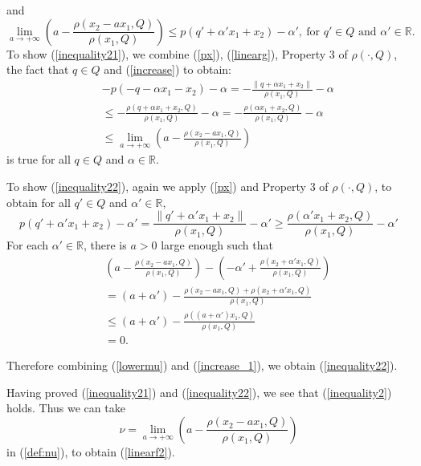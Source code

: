 \documentclass[12pt, reqno]{amsart}
\theoremstyle{definition}
\theoremstyle{remark}
\numberwithin{equation}{section}
\begin{document}
and
\begin{equation}
\label{inequality22}
\lim\limits_{a\to+\infty}\left(a-\frac{\rho(x_2-a x_1,Q)}{\rho(x_1,Q)}\right)\le p(q'+\alpha' x_1+x_2)-\alpha',~\mbox{for $q'\in Q$ and $\alpha'\in\mathbb R$}.
\end{equation}
 To show (\ref{inequality21}), we combine (\ref{px}), (\ref{linearg}),  Property 3 of  $\rho( \cdot , Q)$, the fact that $q\in Q$ and (\ref{increase}) to obtain:
      \begin{eqnarray}
     \label{uppermu}
     &&-p(-q-\alpha x_1-x_2)-\alpha=-\frac{\|q+\alpha x_1+x_2\|}{\rho(x_1,Q)}-\alpha\nonumber\\
     &&\le -\frac{\rho(q+\alpha x_1+x_2,Q)}{\rho(x_1,Q)}-\alpha=-\frac{\rho(\alpha x_1+x_2,Q)}{\rho(x_1,Q)}-\alpha\nonumber\\
     &&\le \lim_{a\to+\infty}\left(a-\frac{\rho(x_2-a x_1,Q)}{\rho(x_1,Q)}\right)
     \end{eqnarray}
     is true  for all $q\in Q$ and $\alpha\in \mathbb R$.

      To show (\ref{inequality22}),  again we apply (\ref{px}) and Property 3  of $\rho(\cdot , Q)$, to obtain for all $q'\in Q$ and $\alpha'\in \mathbb R$,
     \begin{equation}
     \label{lowermu}
     p(q'+\alpha' x_1+x_2)-\alpha'=\frac{\|q'+\alpha' x_1+x_2\|}{\rho(x_1,Q)}-\alpha'\ge\frac{\rho(\alpha' x_1+x_2,Q)}{\rho(x_1,Q)}-\alpha'
     \end{equation}
     For each $\alpha'\in\mathbb R$, there is  $a>0$ large enough such that
     \begin{eqnarray}
\label{increase_1}
&&\left(a-\frac{\rho(x_2-a x_1,Q)}{\rho(x_1,Q)}\right)-\left(-\alpha'+\frac{\rho(x_2+\alpha' x_1,Q)}{\rho(x_1,Q)}\right)\nonumber\\
&&=(a+\alpha')-\frac{\rho(x_2-a x_1,Q)+\rho(x_2+\alpha' x_1,Q)}{\rho(x_1,Q)}\nonumber\\
&&\le (a+\alpha')-\frac{\rho((a+\alpha') x_1,Q)}{\rho(x_1,Q)}\nonumber\\
&&=0.
\end{eqnarray}

     Therefore combining (\ref{lowermu}) and (\ref{increase_1}), we obtain  (\ref{inequality22}).

 Having proved (\ref{inequality21}) and (\ref{inequality22}), we see  that (\ref{inequality2}) holds. Thus we can take $$
 \nu=\lim_{a\to+\infty}\left(a-\frac{\rho(x_2-a x_1,Q)}{\rho(x_1,Q)}\right)
 $$ in (\ref{def:nu}), to obtain (\ref{linearf2}).
\end{document}
